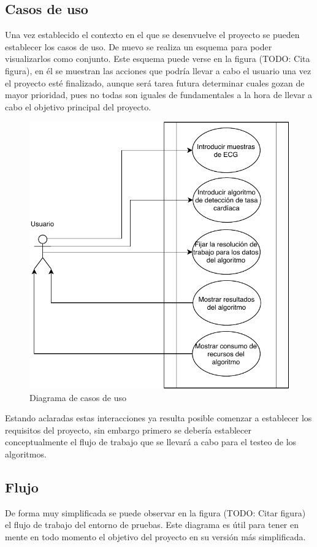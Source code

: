     \subsection{Casos de uso}

    Una vez establecido el contexto en el que se desenvuelve el proyecto se pueden establecer los casos de uso. De nuevo se realiza un esquema para poder visualizarlos como conjunto. Este esquema puede verse en la figura (TODO: Cita figura), en él se muestran las acciones que podría llevar a cabo el usuario una vez el proyecto esté finalizado, aunque será tarea futura determinar cuales gozan de mayor prioridad, pues no todas son iguales de fundamentales a la hora de llevar a cabo el objetivo principal del proyecto.

    \begin{figure}[H]  
        \centering
            \includegraphics[width =0.7\linewidth]{figuras/UseCasesDiagram.pdf}
        \caption{Diagrama de casos de uso}
        \label{fig:UseCasesDiagram}
    \end{figure}

    Estando aclaradas estas interacciones ya resulta posible comenzar a establecer los requisitos del proyecto, sin embargo primero se debería establecer conceptualmente el flujo de trabajo que se llevará a cabo para el testeo de los algoritmos.

    \subsection{Flujo}

    De forma muy simplificada se puede observar en la figura (TODO: Citar figura) el flujo de trabajo del entorno de pruebas. Este diagrama es útil para tener en mente en todo momento el objetivo del proyecto en su versión más simplificada.

